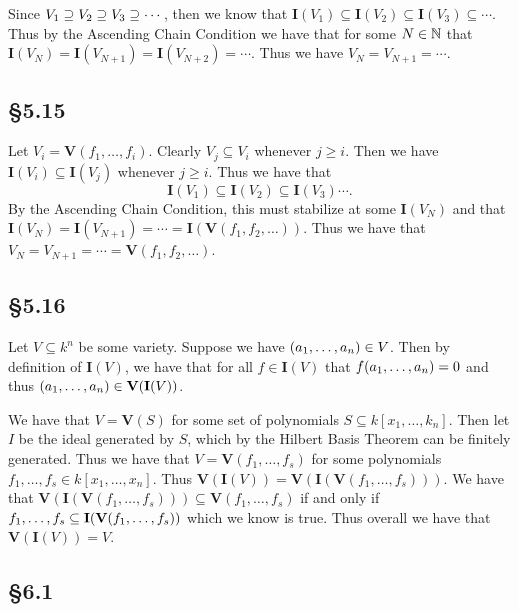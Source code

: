 \documentclass[letterpaper]{article}
\begin{document}
Since $V_{1} \supseteq V_{2} \supseteq V_{3} \supseteq \cdots$, then we know that $\mathbf{I}(V_{1}) \subseteq \mathbf{I}(V_{2}) \subseteq \mathbf{I}(V_{3}) \subseteq \cdots$.
Thus by the Ascending Chain Condition we have that for some $N \in \mathbb{N}$ that $\mathbf{I}(V_{N}) = \mathbf{I}(V_{N + 1}) = \mathbf{I}(V_{N + 2}) = \cdots$.
Thus we have $V_{N} = V_{N + 1} = \cdots$.

\subsection*{\S 5.15}

Let $V_{i} = \textbf{V}(f_{1}, \ldots, f_{i})$.
Clearly $V_{j} \subseteq V_{i}$ whenever $j \geq i$.
Then we have $\mathbf{I}(V_{i}) \subseteq \mathbf{I}(V_{j})$ whenever $j \geq i$.
Thus we have that
\[
  \mathbf{I}(V_{1}) \subseteq \mathbf{I}(V_{2}) \subseteq \mathbf{I}(V_{3}) \cdots.
\]
By the Ascending Chain Condition, this must stabilize at some $\mathbf{I}(V_{N})$ and that $\mathbf{I}(V_{N}) = \mathbf{I}(V_{N + 1}) = \cdots = \mathbf{I}(\textbf{V}(f_{1}, f_{2}, \ldots))$.
Thus we have that $V_{N} = V_{N + 1} = \cdots = \textbf{V}(f_{1}, f_{2}, \ldots)$.

\subsection*{\S 5.16}

Let $V \subseteq k^{n}$ be some variety.
Suppose we have $\pqty{a_{1}, \ldots, a_{n}} \in V$.
Then by definition of $\mathbf{I}(V)$, we have that for all $f \in \mathbf{I}(V)$ that $f\pqty{a_{1}, \ldots, a_{n}} = 0$ and thus $\pqty{a_{1}, \ldots, a_{n}} \in \textbf{V}(\mathbf{I}(V))$.

We have that $V = \textbf{V}(S)$ for some set of polynomials $S \subseteq k[x_{1}, \ldots, k_{n}]$.
Then let $I$ be the ideal generated by $S$, which by the Hilbert Basis Theorem can be finitely generated.
Thus we have that $V = \textbf{V}(f_{1}, \ldots, f_{s})$ for some polynomials $f_{1}, \ldots, f_{s} \in k[x_{1}, \ldots, x_{n}]$.
Thus $\textbf{V}(\mathbf{I}(V)) = \textbf{V}(\mathbf{I}(\textbf{V}(f_{1}, \ldots, f_{s})))$.
We have that $\textbf{V}(\mathbf{I}(\textbf{V}(f_{1}, \ldots, f_{s}))) \subseteq \textbf{V}(f_{1}, \ldots, f_{s})$ if and only if $\gen{f_{1}, \ldots, f_{s}} \subseteq \mathbf{I}(\textbf{V}(f_{1}, \ldots, f_{s}))$ which we know is true.
Thus overall we have that $\textbf{V}(\mathbf{I}(V)) = V$.

\subsection*{\S 6.1}
\end{document}
